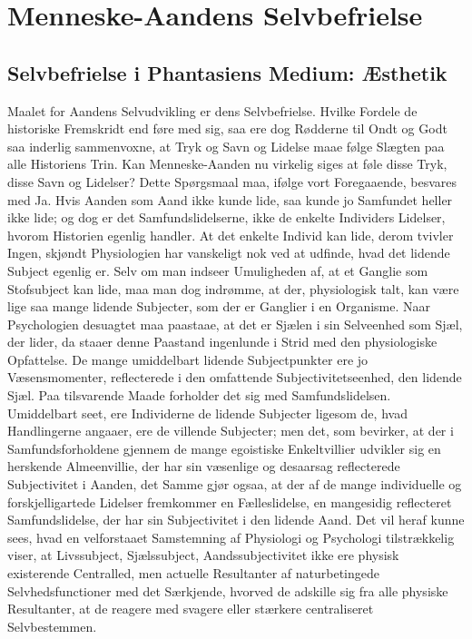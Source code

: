 \documentclass[12pt]{book}
\newcommand{\apage}[1]{\marginnote{\footnotesize\textit{[#1]}}}
\begin{document}
\chapter{Menneske-Aandens Selvbefrielse}

\section{Selvbefrielse i Phantasiens Medium: Æsthetik}
\label{sec:23}

\noindent Maalet for Aandens Selvudvikling er dens Selvbefrielse. Hvilke
Fordele de historiske Fremskridt end føre med sig, saa ere dog Rødderne til
Ondt og Godt saa inderlig sammenvoxne, at Tryk og Savn og Lidelse maae følge
Slægten paa alle Historiens Trin. Kan Menneske-Aanden nu virkelig siges at
føle disse Tryk, \apage{244} disse Savn og Lidelser? Dette Spørgsmaal maa, ifølge vort
Foregaaende, besvares med Ja. Hvis Aanden som Aand ikke kunde lide, saa kunde
jo Samfundet heller ikke lide; og dog er det Samfundslidelserne, ikke de
enkelte Individers Lidelser, hvorom Historien egenlig handler. At det enkelte
Individ kan lide, derom tvivler Ingen, skjøndt Physiologien har vanskeligt
nok ved at udfinde, hvad det lidende Subject egenlig er. Selv om man indseer
Umuligheden af, at et Ganglie som Stofsubject kan lide, maa man dog indrømme,
at der, physiologisk talt, kan være lige saa mange lidende Subjecter, som der
er Ganglier i en Organisme. Naar Psychologien desuagtet maa paastaae, at det
er Sjælen i sin Selveenhed som Sjæl, der lider, da staaer denne Paastand
ingenlunde i Strid med den physiologiske Opfattelse. De mange umiddelbart
lidende Subjectpunkter ere jo Væsensmomenter, reflecterede i den omfattende
Subjectivitetseenhed, den lidende Sjæl. Paa tilsvarende Maade forholder det
sig med Samfundslidelsen. Umiddelbart seet, ere Individerne de lidende
Subjecter ligesom de, hvad Handlingerne angaaer, ere de villende Subjecter;
men det, som bevirker, at der i Samfundsforholdene gjennem de mange egoistiske
Enkeltvillier udvikler sig en herskende Almeenvillie, der har sin væsenlige
og desaarsag reflecterede Subjectivitet i Aanden, det Samme gjør ogsaa, at
der af de mange individuelle og forskjelligartede Lidelser fremkommer en
Fælleslidelse, en mangesidig reflecteret Samfundslidelse, der har sin
Subjectivitet i den lidende Aand. Det vil heraf kunne sees, hvad en
velforstaaet \apage{245} Samstemning af Physiologi og Psychologi tilstrækkelig viser, at
Livssubject, Sjælssubject, Aandssubjectivitet ikke ere physisk existerende
Centralled, men actuelle Resultanter af naturbetingede Selvhedsfunctioner med
det Særkjende, hvorved de adskille sig fra alle physiske Resultanter, at de
reagere med svagere eller stærkere centraliseret Selvbestemmen.
\end{document}
